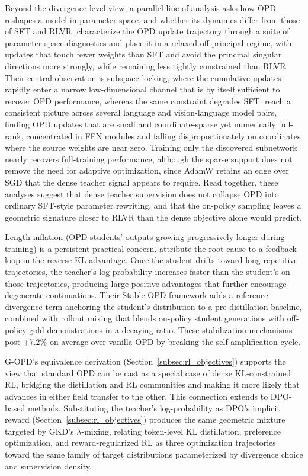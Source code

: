 \documentclass{article} %
\begin{document}
Beyond the divergence-level view, a parallel line of analysis asks how OPD reshapes a model in parameter space, and whether its dynamics differ from those of SFT and RLVR. \citet{2606.07082} characterize the OPD update trajectory through a suite of parameter-space diagnostics and place it in a relaxed off-principal regime, with updates that touch fewer weights than SFT and avoid the principal singular directions more strongly, while remaining less tightly constrained than RLVR. Their central observation is subspace locking, where the cumulative updates rapidly enter a narrow low-dimensional channel that is by itself sufficient to recover OPD performance, whereas the same constraint degrades SFT. \citet{2606.13657} reach a consistent picture across several language and vision-language model pairs, finding OPD updates that are small and coordinate-sparse yet numerically full-rank, concentrated in FFN modules and falling disproportionately on coordinates where the source weights are near zero. Training only the discovered subnetwork nearly recovers full-training performance, although the sparse support does not remove the need for adaptive optimization, since AdamW retains an edge over SGD that the dense teacher signal appears to require. Read together, these analyses suggest that dense teacher supervision does not collapse OPD into ordinary SFT-style parameter rewriting, and that the on-policy sampling leaves a geometric signature closer to RLVR than the dense objective alone would predict.

Length inflation (OPD students' outputs growing progressively longer during training) is a persistent practical concern. \citet{2604.08527} attribute the root cause to a feedback loop in the reverse-KL advantage. Once the student drifts toward long repetitive trajectories, the teacher's log-probability increases faster than the student's on those trajectories, producing large positive advantages that further encourage degenerate continuations. Their Stable-OPD framework adds a reference divergence term anchoring the student's distribution to a pre-distillation baseline, combined with rollout mixing that blends on-policy student generations with off-policy gold demonstrations in a decaying ratio. These stabilization mechanisms post +7.2\% on average over vanilla OPD by breaking the self-amplification cycle.

G-OPD's equivalence derivation (Section~\ref{subsec:rl_objectives}) supports the view that standard OPD can be cast as a special case of dense KL-constrained RL, bridging the distillation and RL communities and making it more likely that advances in either field transfer to the other. This connection extends to DPO-based methods. Substituting the teacher's log-probability as DPO's implicit reward (Section~\ref{subsec:rl_objectives}) produces the same geometric mixture targeted by GKD's $\lambda$-mixing, relating token-level KL distillation, preference optimization, and reward-regularized RL as three optimization trajectories toward the same family of target distributions parameterized by divergence choice and supervision density.
\end{document}
